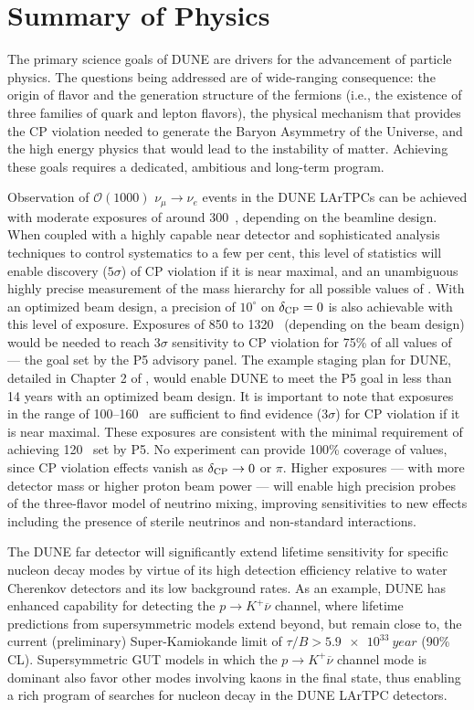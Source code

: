 
\chapter{Summary of Physics}
\label{ch:physics-summary}

The primary science goals of DUNE are drivers for the advancement of
particle physics. The questions being addressed are of wide-ranging
consequence: the origin of flavor and the generation structure of the
fermions (i.e., the existence of three families of quark and lepton
flavors), the physical mechanism that provides the CP violation needed
to generate the Baryon Asymmetry of the Universe, and the high energy
physics that would lead to the instability of matter.  Achieving these
goals requires a dedicated, ambitious and long-term program. 

Observation of $\mathcal{O}(1000)$ $\nu_\mu \rightarrow \nu_e$ events
in the DUNE LArTPCs can be achieved with moderate exposures of around
300~\ktMWyr, depending on the beamline design. When coupled with a
highly capable near detector and sophisticated analysis techniques to
control systematics to a few per cent, this level of statistics will enable
discovery ($5\sigma$) of CP violation if it is near maximal, and an
unambiguous highly precise measurement of the mass hierarchy for all
possible values of \deltacp. With an optimized beam design, a
precision of $10^\circ$ on $\delta_{\rm CP} = 0$ is also achievable
with this level of exposure.  Exposures of 850 to 1320~\ktMWyr{} 
(depending on the beam design) would be needed to reach $3\sigma$
sensitivity to CP violation for 75\% of all values of \deltacp{} --- the
goal set by the P5 advisory panel. The example staging plan for DUNE,
detailed in Chapter 2 of \volintro, would enable DUNE to meet the P5
goal in less than 14 years with an optimized beam design. It is
important to note that exposures in the range of 100--160~\ktMWyr{} are
sufficient to find evidence ($3 \sigma$) for CP violation if it is
near maximal. These exposures are consistent with the minimal
requirement of achieving 120~\ktMWyr{} set by P5. No experiment can
provide 100\% coverage of \deltacp values, since CP violation
effects vanish as $\mdeltacp\to 0$ or $\pi$. Higher exposures --- with
more detector mass or higher proton beam power --- will enable high
precision probes of the three-flavor model of neutrino mixing, improving
sensitivities to new effects including the presence of sterile
neutrinos and non-standard interactions.

The DUNE far detector will significantly extend lifetime sensitivity
for specific nucleon decay modes by virtue of its high detection
efficiency relative to water Cherenkov detectors and its low
background rates.  As an example, DUNE has enhanced capability for
detecting the $p\to K^+\overline{\nu}$ channel, where lifetime
predictions from supersymmetric models extend beyond, but remain close
to, the current (preliminary) Super-Kamiokande limit of $\tau/B >
\SI{5.9e33}{year}$ (90\% CL). Supersymmetric GUT models in which
the $p\to K^+\overline{\nu}$ channel mode is dominant also favor
other modes involving kaons in the final state, thus enabling a rich 
program of searches for nucleon decay in the DUNE LArTPC detectors.

